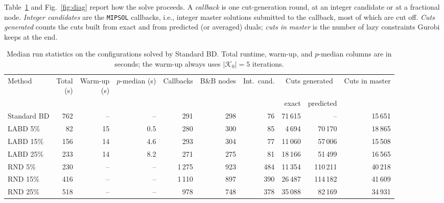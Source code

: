 Table~\ref{tab:runstats} and Fig.~\ref{fig:diag} report how the solve proceeds. A \emph{callback} is one cut-generation round, at an integer candidate or at a fractional node. \emph{Integer candidates} are the \texttt{MIPSOL} callbacks, i.e., integer master solutions submitted to the callback, most of which are cut off. \emph{Cuts generated} counts the cuts built from exact and from predicted (or averaged) duals; \emph{cuts in master} is the number of lazy constraints Gurobi keeps at the end.

\begin{table}[h]
\centering
\caption{Median run statistics on the configurations solved by Standard BD. Total runtime, warm-up, and $p$-median columns are in seconds; the warm-up always uses $|\mathcal K_0|=5$ iterations.}\label{tab:runstats}
\scriptsize
\setlength{\tabcolsep}{3pt}
\begin{tabular}{lrrrrrrrrr}
\toprule
Method & \shortstack{Total\\(s)} & \shortstack{Warm-up\\(s)} & \shortstack{$p$-median\\(s)} & Callbacks & B\&B nodes & Int.\ cand. & \multicolumn{2}{c}{Cuts generated} & Cuts in master\\
\cmidrule(lr){8-9}
 & & & & & & & exact & predicted & \\
\midrule
Standard BD & 762 & -- & -- & 291 & 298 & 76 & 71\,615 & -- & 15\,651\\
LABD 5\% & 82 & 15 & 0.5 & 280 & 300 & 85 & 4\,694 & 70\,170 & 18\,865\\
LABD 15\% & 156 & 14 & 4.6 & 293 & 304 & 77 & 11\,060 & 57\,006 & 15\,508\\
LABD 25\% & 233 & 14 & 8.2 & 271 & 275 & 81 & 18\,166 & 51\,499 & 16\,565\\
RND 5\% & 230 & -- & -- & 1\,275 & 923 & 484 & 11\,354 & 110\,211 & 40\,218\\
RND 15\% & 416 & -- & -- & 1\,110 & 897 & 390 & 26\,487 & 114\,182 & 41\,609\\
RND 25\% & 518 & -- & -- & 978 & 748 & 378 & 35\,088 & 82\,169 & 34\,931\\
\bottomrule
\end{tabular}
\end{table}

